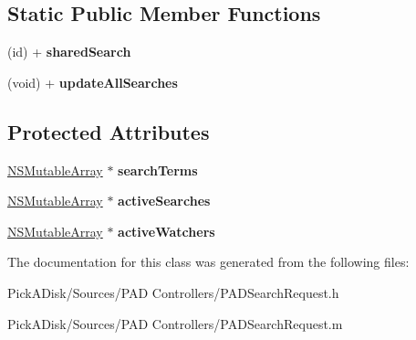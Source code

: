 \subsection*{Static Public Member Functions}
\begin{DoxyCompactItemize}
\item 
\hypertarget{interface_p_a_d_search_service_aaf40ce8ae97a36b223ec83c3418998b1}{
(id) + {\bfseries sharedSearch}}
\label{interface_p_a_d_search_service_aaf40ce8ae97a36b223ec83c3418998b1}

\item 
\hypertarget{interface_p_a_d_search_service_afc4cdf784234399e3eb90c477e89fbcc}{
(void) + {\bfseries updateAllSearches}}
\label{interface_p_a_d_search_service_afc4cdf784234399e3eb90c477e89fbcc}

\end{DoxyCompactItemize}
\subsection*{Protected Attributes}
\begin{DoxyCompactItemize}
\item 
\hypertarget{interface_p_a_d_search_service_a89c3ad69b5c462190549589fbd3eea8c}{
\hyperlink{class_n_s_mutable_array}{NSMutableArray} $\ast$ {\bfseries searchTerms}}
\label{interface_p_a_d_search_service_a89c3ad69b5c462190549589fbd3eea8c}

\item 
\hypertarget{interface_p_a_d_search_service_a74c66528f33323c3d3e13d1f0dbb22f6}{
\hyperlink{class_n_s_mutable_array}{NSMutableArray} $\ast$ {\bfseries activeSearches}}
\label{interface_p_a_d_search_service_a74c66528f33323c3d3e13d1f0dbb22f6}

\item 
\hypertarget{interface_p_a_d_search_service_aeaac05f7a034a52a256a910db3602b19}{
\hyperlink{class_n_s_mutable_array}{NSMutableArray} $\ast$ {\bfseries activeWatchers}}
\label{interface_p_a_d_search_service_aeaac05f7a034a52a256a910db3602b19}

\end{DoxyCompactItemize}


The documentation for this class was generated from the following files:\begin{DoxyCompactItemize}
\item 
PickADisk/Sources/PAD Controllers/PADSearchRequest.h\item 
PickADisk/Sources/PAD Controllers/PADSearchRequest.m\end{DoxyCompactItemize}
